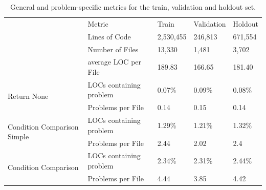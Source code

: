 \begin{table}[]
    \tabcolsep=0.11cm
    \begin{tabularx}{\textwidth}{@{}llXXX@{}}
        \toprule
    \multirow{4}{*}{}                            & Metric                  & Train & Validation & Holdout \\ \cmidrule(l){2-5} 
                                                 & Lines of Code           & 2,530,455 & 246,813 & 671,554 \\
                                                 & Number of Files         & 13,330  &  1,481 & 3,702   \\
                                                 & average LOC per File    & 189.83  & 166.65  & 181.40     \\ \midrule
    \multirow{2}{*}{Return None}                 & LOCs containing problem & 0.07\%  &  0.09\% & 0.08\%  \\
                                                 & Problems per File       & 0.14    & 0.15  & 0.14    \\ \midrule
    \multirow{2}{*}{Condition Comparison Simple} & LOCs containing problem & 1.29\%  &  1.21\%  & 1.32\%  \\
                                                 & Problems per File       & 2.44    & 2.02 & 2.4    \\ \midrule
    \multirow{2}{*}{Condition Comparison}        & LOCs containing problem & 2.34\%  & 2.31\%  & 2.44\%  \\
                                                 & Problems per File       & 4.44    & 3.85  & 4.42    \\ \bottomrule
    \end{tabularx}
    \caption{General and problem-specific metrics for the train, validation and holdout set.}
    \label{tab:general_data_distribution}
\end{table}

